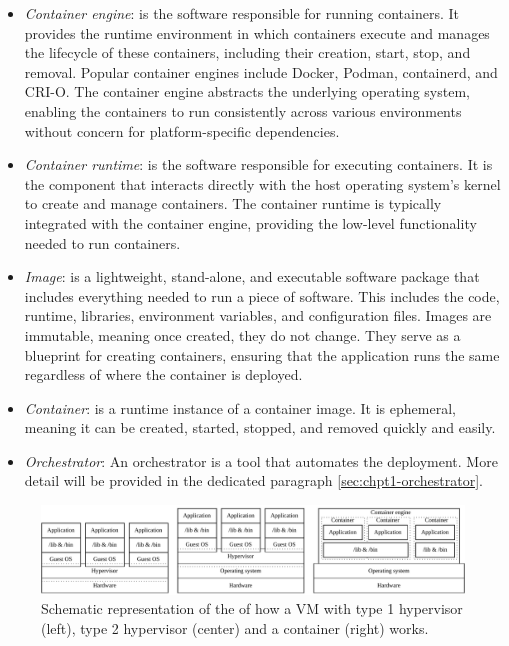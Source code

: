 \begin{itemize}
  \itemsep0em
  \item \textit{Container engine}: is the software responsible for running
    containers. It provides the runtime environment in which containers execute
    and manages the lifecycle of these containers, including their creation,
    start, stop, and removal. Popular container engines include Docker, Podman,
    containerd, and CRI-O. The container engine abstracts the underlying
    operating system, enabling the containers to run consistently across various
    environments without concern for platform-specific dependencies.
  \item \textit{Container runtime}: is the software responsible for executing
    containers. It is the component that interacts directly with the host
    operating system's kernel to create and manage containers. The container
    runtime is typically integrated with the container engine, providing the
    low-level functionality needed to run containers.
  \item \textit{Image}: is a lightweight, stand-alone, and executable software
    package that includes everything needed to run a piece of software. This
    includes the code, runtime, libraries, environment variables, and
    configuration files. Images are immutable, meaning once created, they do not
    change. They serve as a blueprint for creating containers, ensuring that the
    application runs the same regardless of where the container is deployed.
  \item \textit{Container}: is a runtime instance of a container image. It is
    ephemeral, meaning it can be created, started, stopped, and removed quickly
    and easily.
  \item \textit{Orchestrator}: An orchestrator is a tool that automates the
    deployment. More detail will be provided in the dedicated paragraph
    \ref{sec:chpt1-orchestrator}.
\end{itemize}


\begin{figure}[h]
    \centering
    \includegraphics[width=\textwidth]{img/chpt1/VM-vs-Container}
    \caption{Schematic representation of the of how a VM with type 1 hypervisor
      (left), type 2 hypervisor (center) and a container (right) works.}
    \label{fig:VM-vs-Container}
\end{figure}


